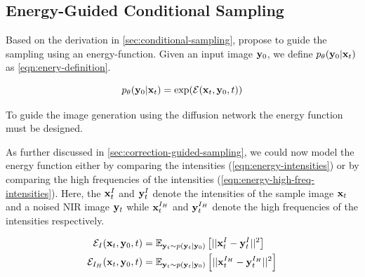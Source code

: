 \subsection{Energy-Guided Conditional Sampling}
\label{sec:energy-guided-sampling}
Based on the derivation in \autoref{sec:conditional-sampling}, \textcite{egsde} propose to guide the sampling using an energy-function.
Given an input image $\mathbf{y}_0$, we define $p_\theta(\mathbf{y}_0|\mathbf{x}_t)$ as \autoref{eqn:enery-definition}.

\begin{equation}
   \label{eqn:enery-definition}
   p_\theta(\mathbf{y}_0|\mathbf{x}_t) = \exp(\mathcal{E}(\mathbf{x}_t, \mathbf{y}_0, t))
\end{equation}

To guide the image generation using the diffusion network the energy function must be designed.

As further discussed in \autoref{sec:correction-guided-sampling},
we could now model the energy function either by comparing the intensities (\autoref{eqn:energy-intensities}) or by comparing the high frequencies of the intensities (\autoref{eqn:energy-high-freq-intensities}).
Here, the $\mathbf{x}^I_t$ and $\mathbf{y}^I_t$ denote the intensities of the sample image $\mathbf{x}_t$ and a noised NIR image $\mathbf{y}_t$ while $\mathbf{x}^{I_H}_t$ and $\mathbf{y}^{I_H}_t$  denote the high frequencies of the intensities respectively.

\begin{align}
   \mathcal{E}_I(\mathbf{x}_t, \mathbf{y}_0, t)     & = \mathbb{E}_{\mathbf{y}_t \sim p(\mathbf{y}_t | \mathbf{y}_0)}\left[|| \mathbf{x}^I_t - \mathbf{y}^I_t ||^2\right] \label{eqn:energy-intensities}                   \\
   \mathcal{E}_{I_H}(\mathbf{x}_t, \mathbf{y}_0, t) & = \mathbb{E}_{\mathbf{y}_t \sim p(\mathbf{y}_t | \mathbf{y}_0)}\left[|| \mathbf{x}^{I_H}_t - \mathbf{y}^{I_H}_t ||^2\right] \label{eqn:energy-high-freq-intensities}
\end{align}



